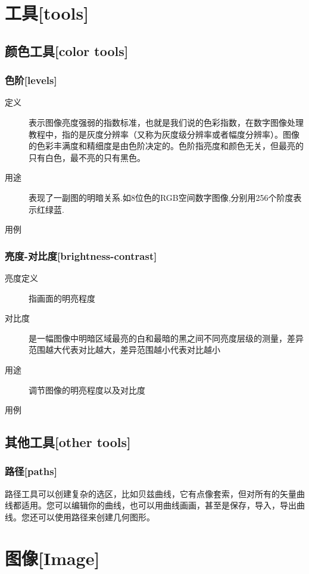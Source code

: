 \section{工具[tools]}
\subsection{颜色工具[color tools]}
\subsubsection{色阶[levels]}
\begin{description}
\item[定义]	表示图像亮度强弱的指数标准，也就是我们说的色彩指数，在数字图像处理教程中，指的是灰度分辨率（又称为灰度级分辨率或者幅度分辨率）。图像的色彩丰满度和精细度是由色阶决定的。色阶指亮度和颜色无关，但最亮的只有白色，最不亮的只有黑色。
\item[用途]	表现了一副图的明暗关系.如8位色的RGB空间数字图像,分别用256个阶度表示红绿蓝.
\item[用例]	
\end{description}


\subsubsection{亮度-对比度[brightness-contrast]}
\begin{description}
\item[亮度定义]	指画面的明亮程度
\item[对比度]		是一幅图像中明暗区域最亮的白和最暗的黑之间不同亮度层级的测量，差异范围越大代表对比越大，差异范围越小代表对比越小
\item[用途]	调节图像的明亮程度以及对比度
\item[用例]	
\end{description}


\subsection{其他工具[other tools]}
\subsubsection{路径[paths]}
路径工具可以创建复杂的选区，比如贝兹曲线，它有点像套索，但对所有的矢量曲线都适用。您可以编辑你的曲线，也可以用曲线画画，甚至是保存，导入，导出曲线。您还可以使用路径来创建几何图形。


\clearpage

\section{图像[Image]}

